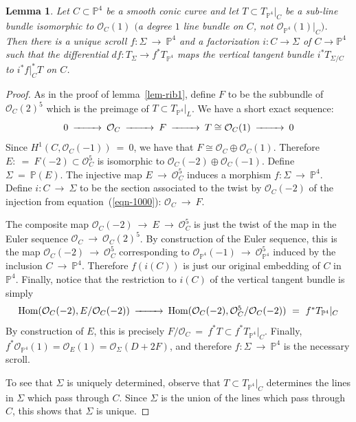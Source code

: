 \documentclass[twoside,12pt,reqno]{amsart}
\theoremstyle{plain}
\newtheorem{lem}[thm]{Lemma}
\theoremstyle{definition}
\newcommand{\PP}{\mathbb{P}}
\def\ps{\vspace{4pt}}
\newcommand{\OO}{\mathcal O}
\begin{document}
\ps

\begin{lem}\label{lem-rib2}  Let $C\subset \PP^4$ be a smooth conic
curve and let $T\subset T_{\PP^4}|_C$ be a sub-line bundle isomorphic
to $\OO_C(1)$ $($a degree $1$ line bundle on $C$, not
$\OO_{\PP^4}(1)|_C)$.  Then there is a unique scroll $f:\Sigma~\rightarrow~
\PP^4$ and a factorization $i:C\rightarrow \Sigma$ of $C\rightarrow \PP^4$ 
such that the differential $df:T_{\Sigma}\rightarrow f^{*}T_{\PP^4}$
maps the vertical tangent bundle $i^{*}T_{\Sigma/C}$
to $i^{*}f|_C^{*}T$ on $C$.
\end{lem}

\begin{proof}
As in the proof of lemma~\ref{lem-rib1}, define $F$ to be the
subbundle of $\OO_C(2)^5$ which is the preimage of $T\subset
T_{\PP^4}|_L$.  We have a short exact sequence:
\begin{equation}\begin{CD}\label{eqn-1000}
0 @>>> \OO_C @>>> F @>>> T\cong \OO_C(1) @>>> 0
\end{CD}\end{equation}
Since $H^1(C,\OO_C(-1))~=~0$, we have that $F\cong \OO_C\oplus
\OO_C(1)$.  Therefore $E:~=~ F(-2) \subset \OO_C^5$ is isomorphic to
$\OO_C(-2)\oplus \OO_C(-1)$.  Define $\Sigma ~=~ \PP(E)$.  The injective
map $E~\rightarrow~ \OO_C^5$ induces a morphism $f:\Sigma ~\rightarrow~
\PP^4$.  Define $i:C~\rightarrow~ \Sigma$ to be the section
associated to the twist by $\OO_C(-2)$ of the injection from
equation~(\ref{eqn-1000}): $\OO_C~\rightarrow~ F$.  

\ps

The composite map
$\OO_C(-2)~\rightarrow~ E ~\rightarrow~ \OO_C^5$ is just the twist of the
map in the Euler sequence $\OO_C~\rightarrow~ \OO_C(2)^5$.  By
construction of the Euler sequence, this is the map
$\OO_C(-2)~\rightarrow~ \OO_C^5$ corresponding to
$\OO_{\PP^4}(-1)~\rightarrow~ \OO_{\PP^4}^5$ induced by the inclusion
$C~\rightarrow~ \PP^4$.  Therefore $f(i(C))$ is just our original
embedding of $C$ in $\PP^4$.  Finally, notice that the restriction to
$i(C)$ of the vertical tangent bundle is simply 
\begin{equation}\begin{CD}
\text{Hom}(\OO_C(-2),E/\OO_C(-2)) @>>>
\text{Hom}(\OO_C(-2),\OO_C^5/\OO_C(-2)) ~=~ f^{*}T_{\PP^4}|_C
\end{CD}\end{equation}
By construction of $E$, this is precisely $F/\OO_C ~=~ f^{*}T\subset
f^{*}T_{\PP^4}|_C$.  Finally, 
$f^{*}\OO_{\PP^4}(1) = \OO_E(1) = \OO_{\Sigma}(D+2F)$, 
and therefore $f:\Sigma~\rightarrow~ \PP^4$ is the necessary scroll.

\ps

To see that $\Sigma$ is uniquely determined, observe that $T\subset
T_{\PP^4}|_C$ determines the lines in $\Sigma$ which pass through
$C$.  Since $\Sigma$ is the union of the lines which pass through $C$, 
this shows that $\Sigma$ is unique.
\end{proof}
\end{document}
